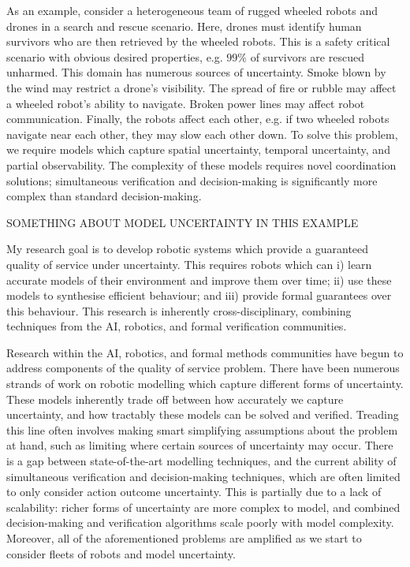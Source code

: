 \documentclass[11pt]{article}
\begin{document}
As an example, consider a heterogeneous team of rugged wheeled robots and drones in a search and rescue scenario.
%
Here, drones must identify human survivors who are then retrieved by the wheeled robots.
%
This is a safety critical scenario with obvious desired properties, e.g. $99\%$ of survivors are rescued unharmed.
%
This domain has numerous sources of uncertainty.
%
Smoke blown by the wind may restrict a drone's visibility.
%
The spread of fire or rubble may affect a wheeled robot's ability to navigate.
%
Broken power lines may affect robot communication.
%
Finally, the robots affect each other, e.g. if two wheeled robots navigate near each other, they may slow each other down.
%
To solve this problem, we require models which capture spatial uncertainty, temporal uncertainty, and partial observability.
%
The complexity of these models requires novel coordination solutions; simultaneous verification and decision-making is significantly more complex than standard decision-making.

SOMETHING ABOUT MODEL UNCERTAINTY IN THIS EXAMPLE


My research goal is to develop robotic systems which provide a guaranteed quality of service under uncertainty.
%
This requires robots which can i) learn accurate models of their environment and improve them over time; ii) use these models to synthesise efficient behaviour; and iii) provide formal guarantees over this behaviour.
%
This research is inherently cross-disciplinary, combining techniques from the AI, robotics, and formal verification communities.
%


Research within the AI, robotics, and formal methods communities have begun to address components of the quality of service problem.
%
There have been numerous strands of work on robotic modelling which capture different forms of uncertainty.
%
These models inherently trade off between how accurately we capture uncertainty, and how tractably these models can be solved and verified.
%
Treading this line often involves making smart simplifying assumptions about the problem at hand, such as limiting where certain sources of uncertainty may occur.
%
There is a gap between state-of-the-art modelling techniques, and the current ability of simultaneous verification and decision-making techniques, which are often limited to only consider action outcome uncertainty.
%
This is partially due to a lack of scalability: richer forms of uncertainty are more complex to model, and combined decision-making and verification algorithms scale poorly with model complexity.
%
Moreover, all of the aforementioned problems are amplified as we start to consider fleets of robots and  model uncertainty.
\end{document}
